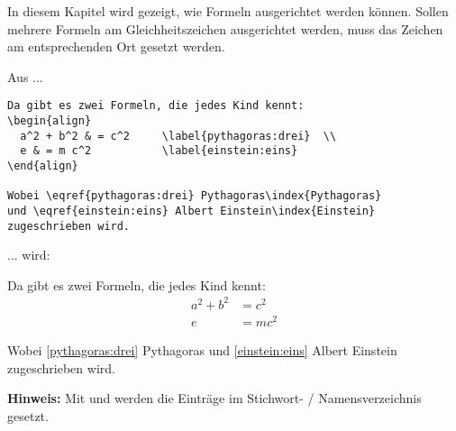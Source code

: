 In diesem Kapitel wird gezeigt, wie Formeln ausgerichtet  werden können. Sollen mehrere Formeln am Gleichheitszeichen ausgerichtet werden, muss das Zeichen \code{\&} am entsprechenden Ort gesetzt werden. 

Aus ...

\begin{tcolorbox}[width=\textwidth,colback={light-gray},title={Latex-Text},colbacktitle=gray,coltitle=white]

\begin{verbatim}
Da gibt es zwei Formeln, die jedes Kind kennt: 
\begin{align}
  a^2 + b^2 & = c^2     \label{pythagoras:drei}  \\
  e & = m c^2           \label{einstein:eins}  
\end{align}

Wobei \eqref{pythagoras:drei} Pythagoras\index{Pythagoras} 
und \eqref{einstein:eins} Albert Einstein\index{Einstein} 
zugeschrieben wird.
\end{verbatim}

\end{tcolorbox}

... wird:

\begin{tcolorbox}[width=\textwidth,colback={light-gray},title={Print-Text},colbacktitle=gray,coltitle=white]

Da gibt es zwei Formeln, die jedes Kind kennt: 
\begin{align}
  a^2 + b^2 & = c^2     \label{pythagoras:drei}  \\  
  e & = m c^2           \label{einstein:eins}  
\end{align}

Wobei \eqref{pythagoras:drei} Pythagoras 
und \eqref{einstein:eins} Albert Einstein 
zugeschrieben wird.

\end{tcolorbox}

\textbf{Hinweis:} Mit  und  werden die Einträge im Stichwort- / Namensverzeichnis gesetzt.
